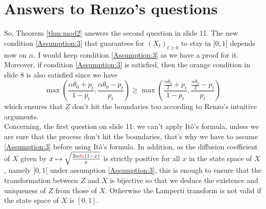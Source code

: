 \documentclass[11pt]{article}
\theoremstyle{definition}
\newcommand{\red}{\textcolor{red}}
\begin{document}
 \section{Answers to Renzo's questions} 
{\color{blue}So, Theorem \ref{thm:mod2} answers the second question in slide 11.} The new condition \eqref{Assumption:3} that guarantees  for $(X_t)_{t\ge0}$ to stay in $]0,1[$ depends now on $\alpha$. I would keep condition \eqref{Assumption:3} as we have a proof for it.  Moreover, if condition \eqref{Assumption:3} is satisfied, then  the orange condition in slide 8 is also satisfied 
since we have 
$$
\max\left(\frac{\alpha\theta_0+\dot p_t}{1-p_t},\frac{\alpha\theta_0-\dot p_t}{p_t}\right)\ge \max\left(\frac{\frac{\alpha\theta_0}{2}+\dot p_t}{1-p_t},\frac{\frac{\alpha\theta_0}{2}-\dot p_t}{p_t}\right)
$$
which ensures that $Z$ don't hit the boundaries too according to Renzo's intuitive arguments.\\ 
{\color{blue}Concerning, the first question on slide 11:} we can't apply Itô's formula, unless we are sure that the process don't hit the boundaries, that's why we have to assume  \eqref{Assumption:3} before using Itô's formula.  In addition, as the diffusion coefficient of $X$  given by  $x\mapsto \sqrt{\frac{2\alpha \red{\theta_0}(1-x)}{x}}$  is strictly positive for all $x$ in the state space of $X$, namely $]0,1[$ under assumption \eqref{Assumption:3},  this is enough to ensure that the transformation between $Z$ and $X$ is bijective so that we deduce the existence and uniqueness of $Z$ from those of $X$. Otherwise the Lamperti transform is not valid if the state space of $X$ is $[0,1]$.


\nocite{*}
 
\printbibliography[keyword={Wind-SDE},title={References}]
\end{document}

